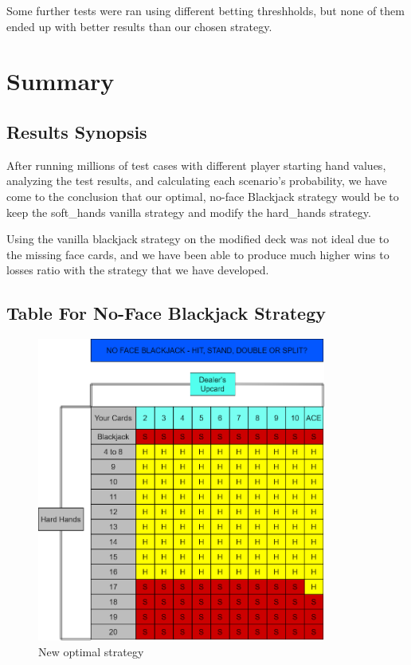 \documentclass{article}
\begin{document}
{		Some further tests were ran using different betting threshholds, but none of them ended up with better results than our chosen
		strategy.

        
\section{Summary}
\label{sec: Summary}

        \subsection{Results Synopsis}
	\label{Results Synopsis}

        After running millions of test cases with different player starting hand values, analyzing the test results, and calculating each scenario's probability, we have come to the conclusion that our optimal, no-face Blackjack strategy would be to keep the soft\_hands vanilla strategy and modify the hard\_hands strategy. 

        Using the vanilla blackjack strategy on the modified deck was not ideal due to the missing face cards, and we have been able to produce much higher wins to losses ratio with the strategy that we have developed. 

        \subsection{Table For No-Face Blackjack Strategy}
	\label{Table For No-Face Blackjack Strategy}
         
		\begin{figure}[H]
			\hypertarget{fig7}{}
			\begin{center}
				\includegraphics[width=9.5cm]{modified-table-strat.png}
				\caption{New optimal strategy}
			\end{center}
		\end{figure}

}
\end{document}
